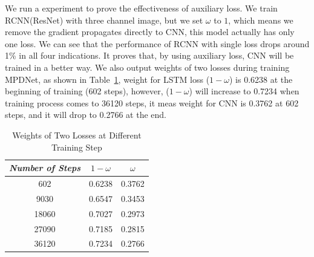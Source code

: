\documentclass[journal]{IEEEtran}
\begin{document}
We run a experiment to prove the effectiveness of auxiliary loss. We train RCNN(ResNet) with three channel image, but we set $\omega$ to $1$, which means we remove the gradient propagates directly to CNN, this model actually has only one loss. We can see that the performance of RCNN with single loss drops around 1\% in all four indications. It proves that, by using auxiliary loss, CNN will be trained in a better way. We also output weights of two losses during training MPDNet, as shown in Table~\ref{weights}, weight for LSTM loss ($1 - \omega$) is 0.6238 at the beginning of training (602 steps), however, ($1 - \omega$) will increase to 0.7234 when training process comes to 36120 steps, it meas weight for CNN is 0.3762 at 602 steps, and it will drop to 0.2766 at the end. 
\begin{table}[t]
    \vspace{-0cm}
    \caption{Weights of Two Losses at Different Training Step}
    \vspace{-0cm}
    \begin{center}
    \begin{tabular}{|c|c|c|}
    \hline
    \textbf{\textit{Number of Steps}} & \textbf{\textit{$1 - \omega$}} & \textbf{\textit{$\omega$}}\\
    \hline
    602 &0.6238 & 0.3762  \\
    9030 &0.6547 & 0.3453  \\
    18060 &0.7027 & 0.2973  \\
    27090 &0.7185 & 0.2815  \\
    36120 &0.7234 & 0.2766  \\
    
    \hline
    \end{tabular}
    \vspace{-0cm}
    \label{weights}
    \end{center}
    \vspace{-0cm}
    \end{table}
\end{document}
